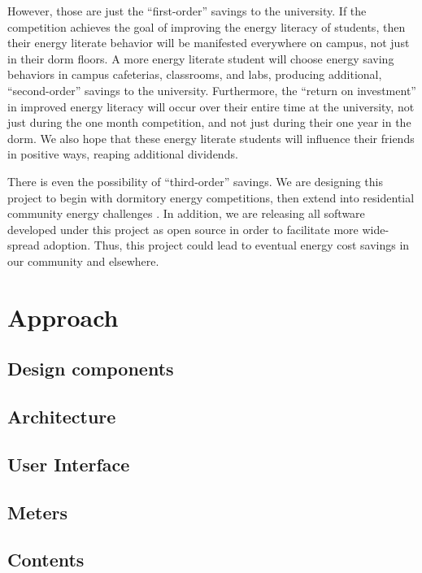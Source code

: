 \documentclass[11pt]{article}
\begin{document}
However, those are just the ``first-order'' savings to the university.  If
the competition achieves the goal of improving the energy literacy of
students, then their energy literate behavior will be manifested everywhere
on campus, not just in their dorm floors.  A more energy literate student
will choose energy saving behaviors in campus cafeterias, classrooms, and
labs, producing additional, ``second-order'' savings to the university.
Furthermore, the ``return on investment'' in improved energy literacy will
occur over their entire time at the university, not just during the one
month competition, and not just during their one year in the dorm.  We also
hope that these energy literate students will influence their friends in
positive ways, reaping additional dividends.

There is even the possibility of ``third-order'' savings.  We are designing
this project to begin with dormitory energy competitions, then extend into
residential community energy challenges \cite{csdl2-09-15}.  In addition,
we are releasing all software developed under this project as open source
in order to facilitate more wide-spread adoption.  Thus, this project could
lead to eventual energy cost savings in our community and elsewhere.

\section{Approach}

\subsection{Design components}

\subsection{Architecture}

\subsection{User Interface}

\subsection{Meters}

\subsection{Contents}
\end{document}
